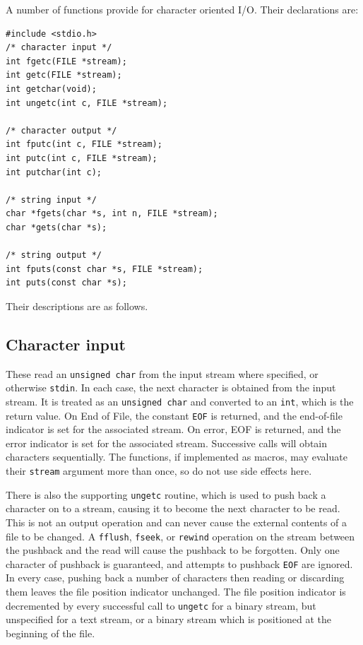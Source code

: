   

  A number of functions provide for character oriented I/O.
   Their declarations are:


  \begin{Verbatim}
#include <stdio.h>
/* character input */
int fgetc(FILE *stream);
int getc(FILE *stream);
int getchar(void);
int ungetc(int c, FILE *stream);

/* character output */
int fputc(int c, FILE *stream);
int putc(int c, FILE *stream);
int putchar(int c);

/* string input */
char *fgets(char *s, int n, FILE *stream);
char *gets(char *s);

/* string output */
int fputs(const char *s, FILE *stream);
int puts(const char *s);
\end{Verbatim}

  Their descriptions are as follows.


  \subsection{Character input}
   

   These read an \texttt{unsigned char} from the input stream where
    specified, or otherwise \texttt{stdin}.  In each case, the next
    character is obtained from the input stream.  It is treated as an
    \texttt{unsigned char} and converted to an \texttt{int}, which is
    the return value.  On End of File, the constant \texttt{EOF} is
    returned, and the end-of-file indicator is set for the associated stream.
    On error, EOF is returned, and the error indicator is set for the
    associated stream.  Successive calls will obtain characters sequentially.
    The functions, if implemented as macros, may evaluate their
    \texttt{stream} argument more than once, so do not use side effects
    here.


   There is also the supporting \texttt{ungetc} routine, which is used
    to push back a character on to a stream, causing it to become the next
    character to be read.  This is not an output operation and can never cause
    the external contents of a file to be changed.  A \texttt{fflush},
    \texttt{fseek}, or \texttt{rewind} operation on the stream between
    the pushback and the read will cause the pushback to be forgotten.  Only
    one character of pushback is guaranteed, and attempts to pushback
    \texttt{EOF} are ignored.  In every case, pushing back a number of
    characters then reading or discarding them leaves the file position
    indicator unchanged.  The file position indicator is decremented by every
    successful call to \texttt{ungetc} for a binary stream, but unspecified
    for a text stream, or a binary stream which is positioned at the beginning
    of the file.


